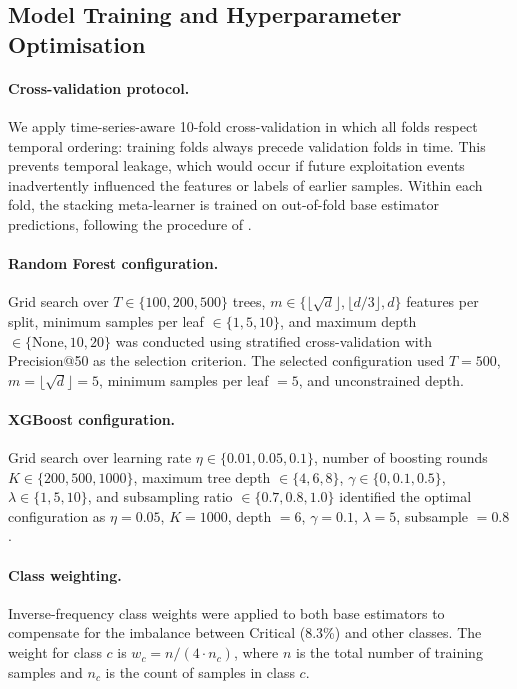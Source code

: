 \documentclass[review,12pt]{elsarticle}
\begin{document}
\subsection{Model Training and Hyperparameter Optimisation}
\label{sec:methodology:training}

\paragraph{Cross-validation protocol.} We apply time-series-aware 10-fold cross-validation in which all folds respect temporal ordering: training folds always precede validation folds in time. This prevents temporal leakage, which would occur if future exploitation events inadvertently influenced the features or labels of earlier samples. Within each fold, the stacking meta-learner is trained on out-of-fold base estimator predictions, following the procedure of \citet{wolpert1992stacking}.

\paragraph{Random Forest configuration.} Grid search over $T \in \{100, 200, 500\}$ trees, $m \in \{\lfloor\sqrt{d}\rfloor, \lfloor d/3\rfloor, d\}$ features per split, minimum samples per leaf $\in \{1, 5, 10\}$, and maximum depth $\in \{\text{None}, 10, 20\}$ was conducted using stratified cross-validation with Precision@50 as the selection criterion. The selected configuration used $T = 500$, $m = \lfloor\sqrt{d}\rfloor = 5$, minimum samples per leaf $= 5$, and unconstrained depth.

\paragraph{XGBoost configuration.} Grid search over learning rate $\eta \in \{0.01, 0.05, 0.1\}$, number of boosting rounds $K \in \{200, 500, 1000\}$, maximum tree depth $\in \{4, 6, 8\}$, $\gamma \in \{0, 0.1, 0.5\}$, $\lambda \in \{1, 5, 10\}$, and subsampling ratio $\in \{0.7, 0.8, 1.0\}$ identified the optimal configuration as $\eta = 0.05$, $K = 1000$, depth $= 6$, $\gamma = 0.1$, $\lambda = 5$, subsample $= 0.8$.

\paragraph{Class weighting.} Inverse-frequency class weights were applied to both base estimators to compensate for the imbalance between Critical (8.3\%) and other classes. The weight for class $c$ is $w_c = n / (4 \cdot n_c)$, where $n$ is the total number of training samples and $n_c$ is the count of samples in class $c$.
\end{document}
